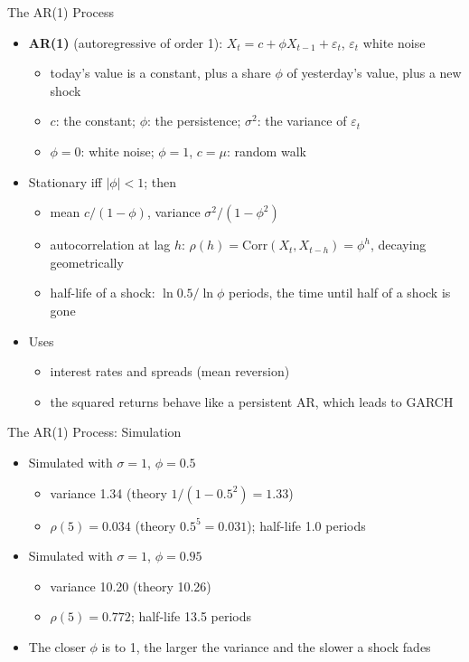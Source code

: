\begin{frame}{The AR(1) Process}
\itemsize{\footnotesize}
\begin{itemize}
    \item \textbf{AR(1)} (autoregressive of order 1): $X_t = c + \phi X_{t-1} + \varepsilon_t$, $\varepsilon_t$ white noise
    \begin{itemize}
        \item today's value is a constant, plus a share $\phi$ of yesterday's value, plus a new shock
        \item $c$: the constant; $\phi$: the persistence; $\sigma^2$: the variance of $\varepsilon_t$
        \item $\phi = 0$: white noise; $\phi = 1$, $c = \mu$: random walk
    \end{itemize}
    \item Stationary iff $|\phi| < 1$; then
    \begin{itemize}
        \item mean $c/(1 - \phi)$, variance $\sigma^2/(1 - \phi^2)$
        \item autocorrelation at lag $h$: $\rho(h) = \text{Corr}(X_t, X_{t-h}) = \phi^h$, decaying geometrically
        \item half-life of a shock: $\ln 0.5/\ln\phi$ periods, the time until half of a shock is gone
    \end{itemize}
    \item Uses
    \begin{itemize}
        \item interest rates and spreads (mean reversion)
        \item the squared returns behave like a persistent AR, which leads to GARCH
    \end{itemize}
\end{itemize}
\end{frame}

\begin{frame}{The AR(1) Process: Simulation}
\itemsize{\small}
\begin{itemize}
    \item Simulated with $\sigma = 1$, $\phi = 0.5$
    \begin{itemize}
        \item variance 1.34 (theory $1/(1 - 0.5^2) = 1.33$)
        \item $\rho(5) = 0.034$ (theory $0.5^5 = 0.031$); half-life 1.0 periods
    \end{itemize}
    \item Simulated with $\sigma = 1$, $\phi = 0.95$
    \begin{itemize}
        \item variance 10.20 (theory 10.26)
        \item $\rho(5) = 0.772$; half-life 13.5 periods
    \end{itemize}
    \item The closer $\phi$ is to 1, the larger the variance and the slower a shock fades
\end{itemize}
\end{frame}

